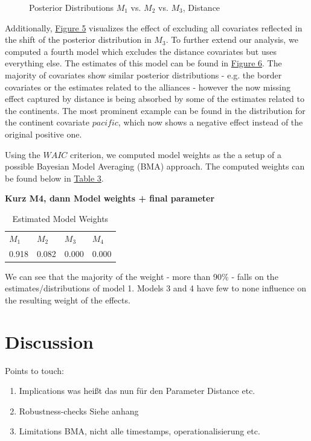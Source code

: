 \documentclass[12pt,a4paper]{article}
\begin{document}
\begin{figure}[h]
\caption{Posterior Distributions $M_1$ vs. $M_2$ vs. $M_3$, Distance}
\end{figure}

Additionally, \hyperref[F:5]{\color{blue}Figure 5} visualizes the effect of excluding all covariates reflected in the shift of the posterior distribution in $M_3$. To further extend our analysis, we computed a fourth model which excludes the distance covariates but uses everything else. The estimates of this model can be found in \hyperref[F:6]{\color{blue}Figure 6}. The majority of covariates show similar posterior distributions - e.g. the border covariates or the estimates related to the alliances - however the now missing effect captured by distance is being absorbed by some of the estimates related to the continents. The most prominent example can be found in the distribution for the continent covariate $pacific$, which now shows a negative effect instead of the original positive one.

Using the $WAIC$ criterion, we computed model weights as the a setup of a possible Bayesian Model Averaging (BMA) approach. The computed weights can be found below in \hyperref[T:3]{\color{blue}Table 3}. 

\textbf{Kurz M4, dann Model weights + final parameter}

\begin{table}[!htbp] \centering 
  \caption{Estimated Model Weights} 
  \label{T:3} 
\begin{tabular}{llll}
$M_1$& $M_2$ & $M_3$& $M_4$\\
0.918 & 0.082 & 0.000 & 0.000 \\
\end{tabular}
\end{table}

We can see that the majority of the weight - more than 90\% - falls on the estimates/distributions of model 1. Models 3 and 4 have few to none influence on the resulting weight of the effects. 

\section{Discussion}
Points to touch: 
\begin{enumerate}
\item Implications  was heißt das nun für den Parameter Distance etc. 
\item Robustness-checks  Siehe anhang
\item Limitations BMA, nicht alle timestamps, operationalisierung etc. 
\end{enumerate}
\clearpage
\end{document}
